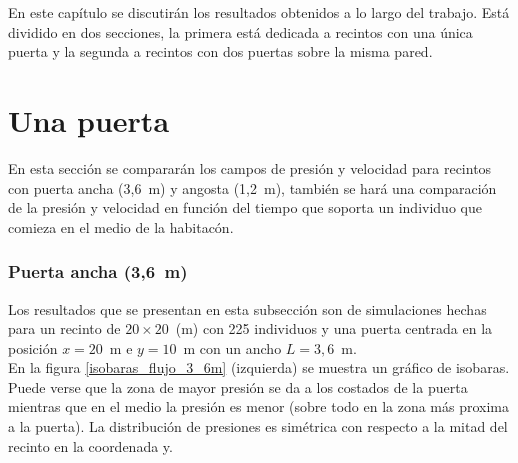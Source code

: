 En este capítulo se discutirán los resultados obtenidos a lo largo del trabajo. Está dividido en dos secciones, la primera está dedicada a recintos con una única puerta y la segunda a recintos con dos puertas sobre la misma pared.  

\section{Una puerta}

En esta sección se compararán los campos de presión y velocidad para recintos con puerta ancha (3,6~m) y angosta (1,2~m), también se hará una comparación de la presión y velocidad en función del tiempo que soporta un individuo que comieza en el medio de la habitacón.    

\subsubsection{Puerta ancha (3,6~m)}

Los resultados que se presentan en esta subsección son de simulaciones hechas para un recinto de  $20\times 20$~(m) con 225 individuos y una puerta centrada en la posición $x=20$~m e $y=10$~m con un ancho $L=3,6$~m.\\
En la figura \ref{isobaras_flujo_3_6m} (izquierda) se muestra un gráfico de isobaras. Puede verse que la zona de mayor presión se da a los costados de la puerta mientras que en el medio la presión es menor (sobre todo en la zona más proxima a la puerta). La distribución de presiones es simétrica con respecto a la mitad del recinto en la coordenada y. 

